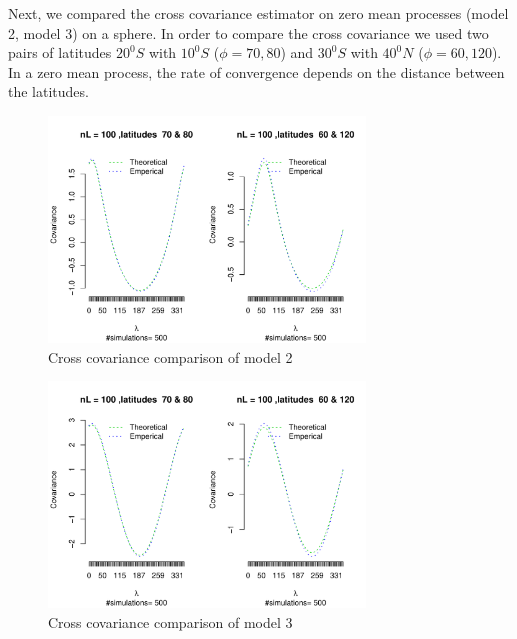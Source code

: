 Next, we compared the cross covariance estimator on zero mean processes (model 2, model 3) on a sphere. In order to compare the cross covariance we used two pairs of latitudes $20^0S$ with $10^0S$ ($\phi = 70, 80$) and $30^0S$ with $40^0N$ ($\phi = 60, 120$). In a zero mean process, the rate of convergence depends on the distance between the latitudes.    




\begin{figure}[H]
	\begin{center}
		\includegraphics [width=0.75\textwidth ]{graphs/Model2.pdf}
		\caption{Cross covariance comparison of model 2}
	\end{center}
\end{figure}


\begin{figure}[H]
	\begin{center}
		\includegraphics [width=0.75\textwidth ]{graphs/Model3.pdf}
		\caption{Cross covariance comparison of model 3}
	\end{center}
\end{figure}




%
